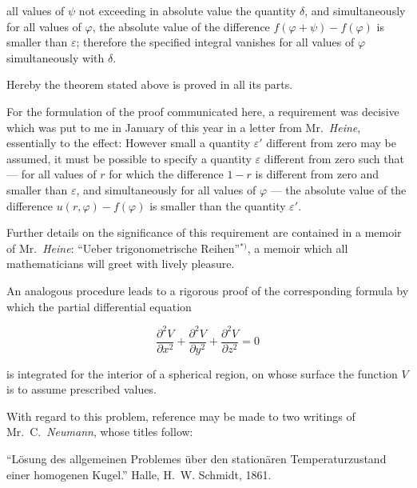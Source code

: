 \documentclass{article}
\begin{document}

all values of $\psi$ not exceeding in absolute value the quantity $\delta$, and simultaneously for all values of $\varphi$, the absolute value of the difference $f(\varphi + \psi) - f(\varphi)$ is smaller than $\varepsilon$; therefore the specified integral vanishes for all values of $\varphi$ simultaneously with $\delta$.



Hereby the theorem stated above is proved in all its parts.



For the formulation of the proof communicated here, a requirement was decisive which was put to me in January of this year in a letter from Mr.~\emph{Heine}, essentially to the effect: However small a quantity $\varepsilon'$ different from zero may be assumed, it must be possible to specify a quantity $\varepsilon$ different from zero such that --- for all values of $r$ for which the difference $1 - r$ is different from zero and smaller than $\varepsilon$, and simultaneously for all values of $\varphi$ --- the absolute value of the difference $u(r, \varphi) - f(\varphi)$ is smaller than the quantity $\varepsilon'$.



Further details on the significance of this requirement are contained in a memoir of Mr.~\emph{Heine}: ``Ueber trigonometrische Reihen''${}^{*)}$, a memoir which all mathematicians will greet with lively pleasure.



An analogous procedure leads to a rigorous proof of the corresponding formula by which the partial differential equation

\[

\frac{\partial^2 V}{\partial x^2} + \frac{\partial^2 V}{\partial y^2} + \frac{\partial^2 V}{\partial z^2} = 0

\]

is integrated for the interior of a spherical region, on whose surface the function $V$ is to assume prescribed values.



With regard to this problem, reference may be made to two writings of Mr.~C.~\emph{Neumann}, whose titles follow:



``Lösung des allgemeinen Problemes über den stationären Temperaturzustand einer homogenen Kugel.'' Halle, H.~W. Schmidt, 1861.
\end{document}
